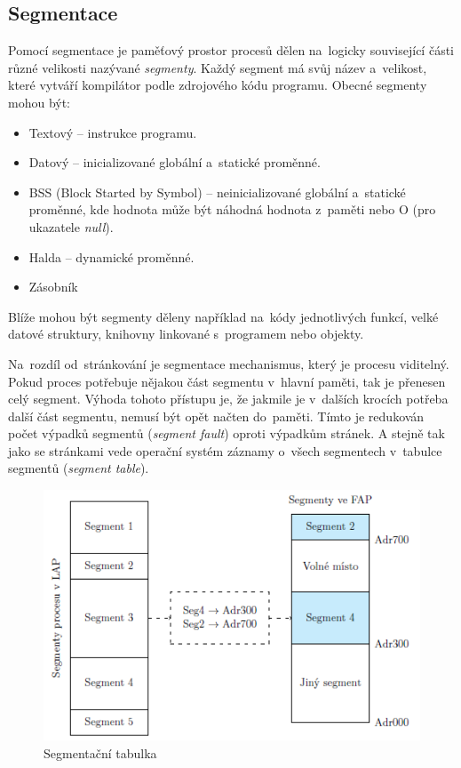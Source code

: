 \subsection{Segmentace}

Pomocí segmentace je paměťový prostor procesů dělen na~logicky související části různé velikosti nazývané \emph{segmenty}. Každý segment má svůj název a~velikost, které vytváří kompilátor podle zdrojového kódu programu. Obecné segmenty mohou být:

\begin{itemize}
	\item Textový -- instrukce programu.
	\item Datový -- inicializované globální a~statické proměnné.
	\item BSS (Block Started by Symbol) -- neinicializované globální a~statické proměnné, kde hodnota může být náhodná hodnota z~paměti nebo O (pro ukazatele \emph{null}).
	\item Halda -- dynamické proměnné.
	\item Zásobník
\end{itemize}

Blíže mohou být segmenty děleny například na~kódy jednotlivých funkcí, velké datové struktury, knihovny linkované s~programem nebo objekty.

Na~rozdíl od~stránkování je segmentace mechanismus, který je procesu viditelný. Pokud proces potřebuje nějakou část segmentu v~hlavní paměti, tak je přenesen celý segment. Výhoda tohoto přístupu je, že jakmile je v~dalších krocích potřeba další část segmentu, nemusí být opět načten do~paměti. Tímto je redukován počet výpadků segmentů (\emph{segment fault}) oproti výpadkům stránek. A stejně tak jako se stránkami vede operační systém záznamy o~všech segmentech v~tabulce segmentů (\emph{segment table}).

\begin{figure}[ht]
	\centering
	\includegraphics[scale=1]{images/mem_segment_table.png}
	\caption{Segmentační tabulka}
	\label{mem_segment_table}
\end{figure}

